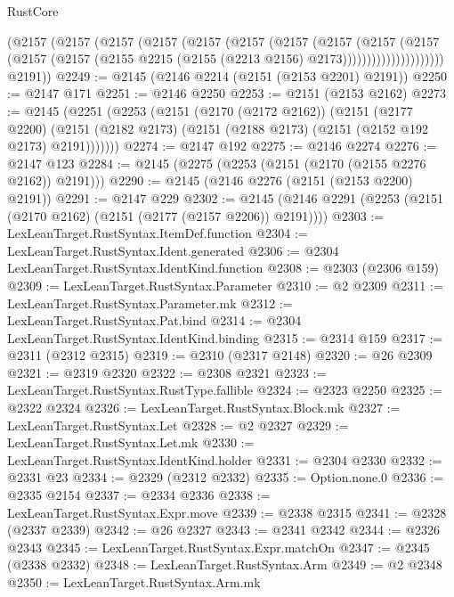 \begin{lexlean}{RustCore}
\begin{coremodule}
                      (@2157
                        (@2157
                          (@2157
                            (@2157
                              (@2157
                                (@2157
                                  (@2157
                                    (@2157
                                      (@2157
                                        (@2157
                                          (@2157
                                            (@2157
                                              (@2155
                                                @2215
                                                (@2155 (@2213 @2156) @2173)))))))))))))))))))))
        @2191))
@2249 := @2145 (@2146 @2214 (@2151 (@2153 @2201) @2191))
@2250 := @2147 @171
@2251 := @2146 @2250
@2253 := @2151 (@2153 @2162)
@2273 := @2145
    (@2251
      (@2253
        (@2151
          (@2170 (@2172 @2162))
          (@2151
            (@2177 @2200)
            (@2151 (@2182 @2173) (@2151 (@2188 @2173) (@2151 (@2152 @192 @2173) @2191)))))))
@2274 := @2147 @192
@2275 := @2146 @2274
@2276 := @2147 @123
@2284 := @2145 (@2275 (@2253 (@2151 (@2170 (@2155 @2276 @2162)) @2191)))
@2290 := @2145 (@2146 @2276 (@2151 (@2153 @2200) @2191))
@2291 := @2147 @229
@2302 := @2145 (@2146 @2291 (@2253 (@2151 (@2170 @2162) (@2151 (@2177 (@2157 @2206)) @2191))))
@2303 := LexLeanTarget.RustSyntax.ItemDef.function
@2304 := LexLeanTarget.RustSyntax.Ident.generated
@2306 := @2304 LexLeanTarget.RustSyntax.IdentKind.function
@2308 := @2303 (@2306 @159)
@2309 := LexLeanTarget.RustSyntax.Parameter
@2310 := @2 @2309
@2311 := LexLeanTarget.RustSyntax.Parameter.mk
@2312 := LexLeanTarget.RustSyntax.Pat.bind
@2314 := @2304 LexLeanTarget.RustSyntax.IdentKind.binding
@2315 := @2314 @159
@2317 := @2311 (@2312 @2315)
@2319 := @2310 (@2317 @2148)
@2320 := @26 @2309
@2321 := @2319 @2320
@2322 := @2308 @2321
@2323 := LexLeanTarget.RustSyntax.RustType.fallible
@2324 := @2323 @2250
@2325 := @2322 @2324
@2326 := LexLeanTarget.RustSyntax.Block.mk
@2327 := LexLeanTarget.RustSyntax.Let
@2328 := @2 @2327
@2329 := LexLeanTarget.RustSyntax.Let.mk
@2330 := LexLeanTarget.RustSyntax.IdentKind.holder
@2331 := @2304 @2330
@2332 := @2331 @23
@2334 := @2329 (@2312 @2332)
@2335 := Option.none.{0}
@2336 := @2335 @2154
@2337 := @2334 @2336
@2338 := LexLeanTarget.RustSyntax.Expr.move
@2339 := @2338 @2315
@2341 := @2328 (@2337 @2339)
@2342 := @26 @2327
@2343 := @2341 @2342
@2344 := @2326 @2343
@2345 := LexLeanTarget.RustSyntax.Expr.matchOn
@2347 := @2345 (@2338 @2332)
@2348 := LexLeanTarget.RustSyntax.Arm
@2349 := @2 @2348
@2350 := LexLeanTarget.RustSyntax.Arm.mk

\end{coremodule}
\end{lexlean}
